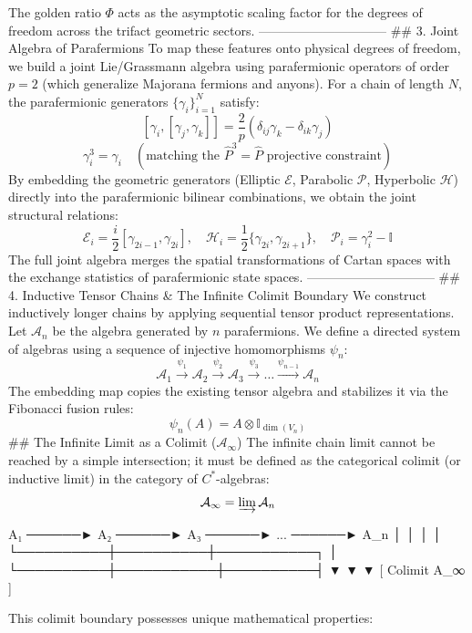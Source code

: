 The golden ratio $\Phi$ acts as the asymptotic scaling factor for the degrees of freedom across the trifact geometric sectors.
------------------------------
## 3. Joint Algebra of Parafermions
To map these features onto physical degrees of freedom, we build a joint Lie/Grassmann algebra using parafermionic operators of order $p=2$ (which generalize Majorana fermions and anyons). For a chain of length $N$, the parafermionic generators $\{\gamma_i\}_{i=1}^N$ satisfy:
$$[\gamma_i, [\gamma_j, \gamma_k]] = \frac{2}{p} \left( \delta_{ij}\gamma_k - \delta_{ik}\gamma_j \right)$$ 
$$\gamma_i^3 = \gamma_i \quad (\text{matching the } \hat{P}^3=\hat{P} \text{ projective constraint})$$ 
By embedding the geometric generators (Elliptic $\mathcal{E}$, Parabolic $\mathcal{P}$, Hyperbolic $\mathcal{H}$) directly into the parafermionic bilinear combinations, we obtain the joint structural relations:
$$\mathcal{E}_i = \frac{i}{2}[\gamma_{2i-1}, \gamma_{2i}], \quad \mathcal{H}_i = \frac{1}{2}\{\gamma_{2i}, \gamma_{2i+1}\}, \quad \mathcal{P}_i = \gamma_i^2 - \mathbb{I}$$ 
The full joint algebra merges the spatial transformations of Cartan spaces with the exchange statistics of parafermionic state spaces.
------------------------------
## 4. Inductive Tensor Chains & The Infinite Colimit Boundary
We construct inductively longer chains by applying sequential tensor product representations. Let $\mathcal{A}_n$ be the algebra generated by $n$ parafermions. We define a directed system of algebras using a sequence of injective homomorphisms $\psi_n$:
$$\mathcal{A}_1 \xrightarrow{\psi_1} \mathcal{A}_2 \xrightarrow{\psi_2} \mathcal{A}_3 \xrightarrow{\psi_3} \dots \xrightarrow{\psi_{n-1}} \mathcal{A}_n$$ 
The embedding map copies the existing tensor algebra and stabilizes it via the Fibonacci fusion rules:
$$\psi_n(A) = A \otimes \mathbb{I}_{\dim(V_n)}$$ 
## The Infinite Limit as a Colimit ($\mathcal{A}_\infty$)
The infinite chain limit cannot be reached by a simple intersection; it must be defined as the categorical colimit (or inductive limit) in the category of $C^*$-algebras:
$$\mathcal{A}_\infty = \varinjlim \mathcal{A}_n$$ 

   A₁ ──────► A₂ ──────► A₃ ──────► ... ──────► A_n
    │          │          │                      │
    └──────────┼──────────┼───────────┐          │
               └──────────┼───────────┼──────────┤
                          ▼           ▼          ▼
                               [ Colimit A_∞ ]

This colimit boundary possesses unique mathematical properties:

